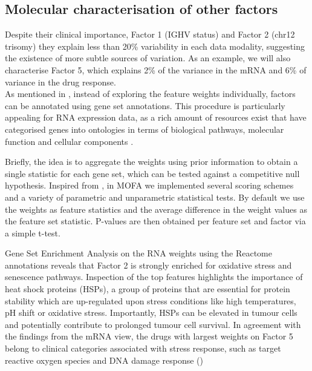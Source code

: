 \subsection{Molecular characterisation of other factors}

Despite their clinical importance, Factor 1 (IGHV status) and Factor 2 (chr12 trisomy) they explain less than 20\% variability in each data modality, suggesting the existence of more subtle sources of variation. As an example, we will also characterise Factor 5, which explains 2\% of the variance in the mRNA and 6\% of variance in the drug response.\\
As mentioned in , instead of exploring the feature weights individually, factors can be annotated using gene set annotations. This procedure is particularly appealing for RNA expression data, as a rich amount of resources exist that have categorised genes into ontologies in terms of biological pathways, molecular function and cellular components  \cite{Fabregat2015,Ashburner2000}.

Briefly, the idea is to aggregate the weights using prior information to obtain a single statistic for each gene set, which can be tested against a competitive null hypothesis. Inspired from \cite{Frost2015}, in MOFA we implemented several scoring schemes and a variety of parametric and unparametric statistical tests. By default we use the weights as feature statistics and the average difference in the weight values as the feature set statistic. P-values are then obtained per feature set and factor via a simple t-test.

Gene Set Enrichment Analysis on the RNA weights using the Reactome annotations \cite{Fabregat2015} reveals that Factor 2 is strongly enriched for oxidative stress and senescence pathways. Inspection of the top features highlights the importance of heat shock proteins (HSPs), a group of proteins that are essential for protein stability which are up-regulated upon stress conditions like high temperatures, pH shift or oxidative stress. Importantly, HSPs can be elevated in tumour cells and potentially contribute to prolonged tumour cell survival\cite{Dempsey2010}. In agreement with the findings from the mRNA view, the drugs with largest weights on Factor 5 belong to clinical categories associated with stress response, such as target reactive oxygen species and DNA damage response ()


